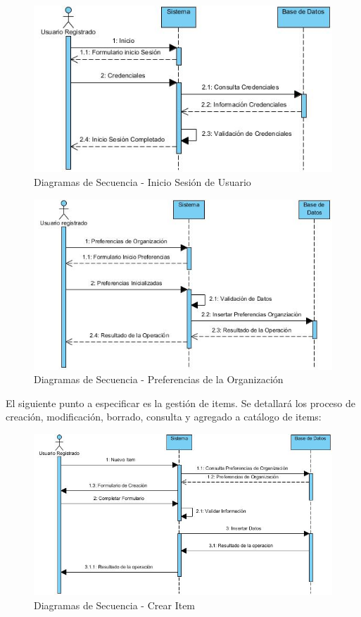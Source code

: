 \documentclass[a4paper,11pt]{book}
\begin{document}
\begin{figure}[H] 
\centering 
\includegraphics[scale=0.50]{imagenes/secuencia/Inicio_Sesion.jpg}
\caption{ Diagramas de Secuencia - Inicio Sesión de Usuario\cite{diagrama}  }  
\end{figure}

\begin{figure}[H] 
\centering 
\includegraphics[scale=0.50]{imagenes/secuencia/Preferencias_secuencia.jpg}
\caption{ Diagramas de Secuencia - Preferencias de la Organización\cite{diagrama}  }  
\end{figure}


El siguiente punto a especificar es la gestión de items. Se detallará los proceso de creación, modificación, borrado, consulta y agregado a catálogo de items:

\begin{figure}[H] 
\centering 
\includegraphics[scale=0.50]{imagenes/secuencia/Crear_Item.jpg}
\caption{ Diagramas de Secuencia - Crear Item\cite{diagrama}  }  
\end{figure}
\end{document}
